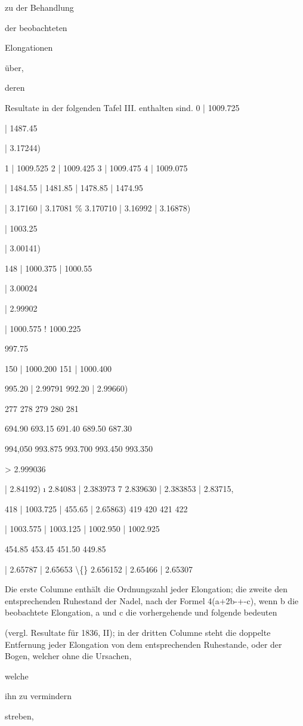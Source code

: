 \documentclass[12pt,a4paper]{article}
\begin{document}
zu der Behandlung

der beobachteten

Elongationen

über,

deren

Resultate in der folgenden Tafel III. enthalten sind. 0 | 1009.725

| 1487.45

| 3.17244)

1 | 1009.525 2 | 1009.425 3 | 1009.475 4 | 1009.075

| 1484.55 | 1481.85 | 1478.85 | 1474.95

| 3.17160 | 3.17081 \% 3.170710 | 3.16992 | 3.16878)

| 1003.25

| 3.00141)

148 | 1000.375 | 1000.55

| 3.00024

| 2.99902

| 1000.575 ! 1000.225

997.75

150 | 1000.200 151 | 1000.400

995.20 | 2.99791 992.20 | 2.99660)

277 278 279 280 281

694.90 693.15 691.40 689.50 687.30

994,050 993.875 993.700 993.450 993.350

> 2.999036

| 2.84192) ı 2.84083 | 2.383973 7 2.839630 | 2.383853 | 2.83715,

418 | 1003.725 | 455.65 | 2.65863) 419 420 421 422

| 1003.575 | 1003.125 | 1002.950 | 1002.925

454.85 453.45 451.50 449.85

| 2.65787 | 2.65653 \textbackslash\{\} 2.656152 | 2.65466 | 2.65307

Die erste Columne enthält die Ordnungszahl jeder Elongation; die zweite den entsprechenden Ruhestand der Nadel, nach der Formel 4(a+2b-+-c), wenn b die beobachtete Elongation, a und c die vorhergehende und folgende bedeuten

(vergl. Resultate für 1836, II); in der dritten Columne steht die doppelte Entfernung jeder Elongation von dem entsprechenden Ruhestande, oder der Bogen, welcher ohne die Ursachen,

welche

ihn zu vermindern

streben,
\end{document}
